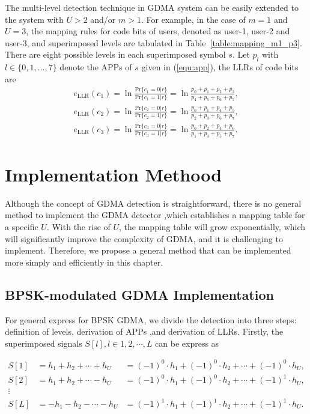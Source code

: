 The multi-level detection technique in GDMA system can be easily extended to the system with $U>2$ and/or $m>1$. For example, in the case of $m=1$ and $U=3$, the mapping rules for code bits of users, denoted as user-1, user-2 and user-3, and superimposed levels are tabulated in Table~\ref{table:mapping_m1_p3}. There are eight possible levels in each superimposed symbol $s$. Let $p_l$ with $l \in \{0,1,...,7\}$ denote the APPs of $s$ given in (\ref{equ:app}), the LLRs of code bits are
\begin{align}
 e_{\text{LLR}}({c}_1) = \ln \frac {\text{Pr}\{c_1 = 0|r\}} {\text{Pr}\{c_1 = 1|r\}} = \ln\frac {p_{0}+p_{1}+p_{2}+p_{3}} {p_{4}+p_{5}+p_{6}+p_{7}}, \nonumber \\
 e_{\text{LLR}}({c}_2) = \ln \frac {\text{Pr}\{c_2 = 0|r\}} {\text{Pr}\{c_2 = 1|r\}} = \ln\frac {p_{0}+p_{1}+p_{4}+p_{5}} {p_{2}+p_{3}+p_{6}+p_{7}}, \nonumber \\
 e_{\text{LLR}}({c}_3) = \ln \frac {\text{Pr}\{c_3 = 0|r\}} {\text{Pr}\{c_3 = 1|r\}} = \ln\frac {p_{0}+p_{2}+p_{4}+p_{6}} {p_{1}+p_{3}+p_{5}+p_{7}}.
\label{equ:p3_llr}
\end{align}



\section{Implementation Methood}

Although the concept of GDMA detection is straightforward, there is no general method to implement the GDMA detector \cite{bh18}\cite{yt19} ,which establishes a mapping table for a specific $U$. With the rise of $U$, the mapping table will grow exponentially, which will significantly improve the complexity of GDMA, and it is challenging to implement. Therefore, we propose a general method that can be implemented more simply and efficiently in this chapter.

\subsection{BPSK-modulated GDMA Implementation}

For general express for BPSK GDMA, we divide the detection into three steps: definition of levels, derivation of APPs ,and derivation of LLRs. Firstly, the superimposed signals $S[l],l\in{1,2,\cdots,L}$ can be express as

\begin{align}
S[1] &= h_{1} + h_{2} + \cdots + h_{U}&={(-1)}^{0} \cdot h_{1}+{(-1)}^{0} \cdot h_{2}+ \cdots + {(-1)}^{0} \cdot h_{U},
 \nonumber \\
S[2] &= h_{1} + h_{2} + \cdots - h_{U}&={(-1)}^{0} \cdot h_{1}+{(-1)}^{0} \cdot h_{2}+ \cdots + {(-1)}^{1} \cdot h_{U}, 
\nonumber \\
\vdots 
\nonumber \\
S[L] &= - h_{1} - h_{2} - \cdots - h_{U}&={(-1)}^{1} \cdot h_{1}+{(-1)}^{1} \cdot h_{2}+ \cdots + {(-1)}^{1} \cdot h_{U}.
\nonumber \\
\end{align}

